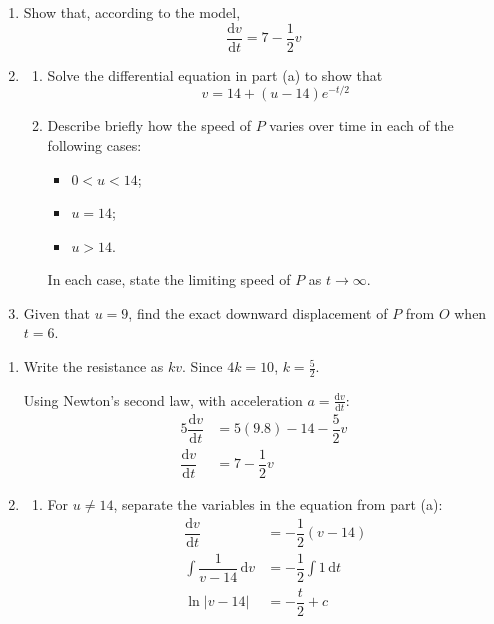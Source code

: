 \documentclass[leqno]{article}
\begin{document}
\begin{enumerate}[
  label=\textbf{\arabic*.},
  leftmargin=*,
  topsep=0pt,
  partopsep=0pt,
  parsep=0pt
]
\begin{enumerate}[label=\textbf{(\alph*)}]
  \item Show that, according to the model,
  \[
  \dfrac{\mathrm{d}v}{\mathrm{d}t}=7-\dfrac{1}{2}v
  \]
  \item
  \begin{enumerate}[label=(\roman*)]
    \item Solve the differential equation in part (a) to show that
    \[
    v=14+(u-14)e^{-t/2}
    \]
    \item Describe briefly how the speed of $P$ varies over time in each of the following cases:
    \begin{itemize}
      \item $0<u<14$;
      \item $u=14$;
      \item $u>14$.
    \end{itemize}
    In each case, state the limiting speed of $P$ as $t\to\infty$.  \\
  \end{enumerate}
  \item Given that $u=9$, find the exact downward displacement of $P$ from $O$ when $t=6$.  \\
\end{enumerate}

\vspace*{10pt}

\begin{djsSolution}
\begin{enumerate}[label=\textbf{(\alph*)}, start=1]
\item Write the resistance as \(kv\). Since \(4k=10\), \(k=\frac52\).

Using Newton's second law, with acceleration \(a=\frac{\mathrm{d}v}{\mathrm{d}t}\):
\begin{align*}
5\dfrac{\mathrm{d}v}{\mathrm{d}t}&=5(9.8)-14-\dfrac52v\\
\dfrac{\mathrm{d}v}{\mathrm{d}t}&=7-\dfrac12v
\end{align*}

\item
\begin{enumerate}[label=(\roman*), start=1]
\item For \(u\ne14\), separate the variables in the equation from part (a):
\begin{align*}
\dfrac{\mathrm{d}v}{\mathrm{d}t}&=-\dfrac12(v-14)\\
\int\dfrac{1}{v-14}\,\mathrm{d}v&=-\dfrac12\int1\,\mathrm{d}t\\
\ln|v-14|&=-\dfrac t2+c
\end{align*}


\end{enumerate}
\end{enumerate}
\end{djsSolution}
\end{enumerate}
\end{document}
